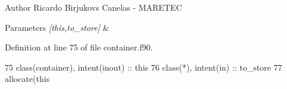 \begin{DoxyAuthor}{Author}
Ricardo Birjukovs Canelas -\/ M\+A\+R\+E\+T\+EC 
\end{DoxyAuthor}

\begin{DoxyParams}{Parameters}
{\em \mbox{[}this,to\+\_\+store\mbox{]}} & \\
\hline
\end{DoxyParams}


Definition at line 75 of file container.\+f90.


\begin{DoxyCode}
75     \textcolor{keywordtype}{class}(container), \textcolor{keywordtype}{intent(inout)} :: this
76     \textcolor{keywordtype}{class}(*), \textcolor{keywordtype}{intent(in)} :: to\_store
77     \textcolor{keyword}{allocate}(this%
\end{DoxyCode}
